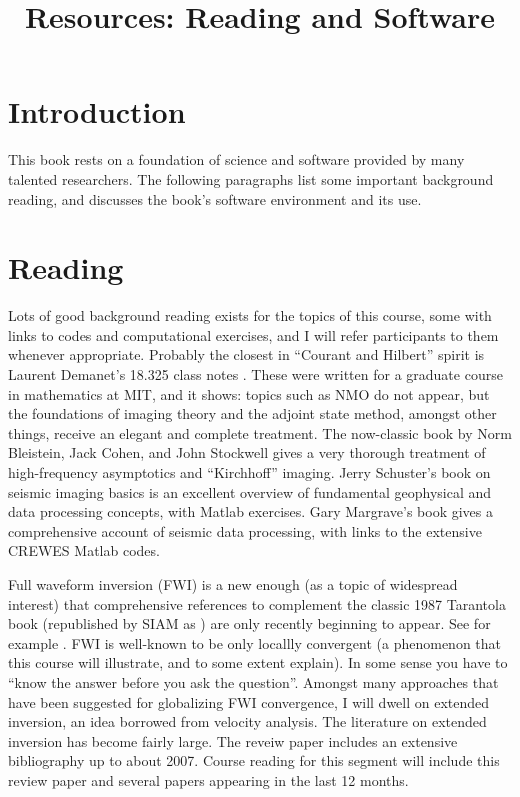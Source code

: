 \title{Resources: Reading and Software}
\maketitle 
\label{ch:madfigs}

\section{Introduction}
This book rests on a foundation of science and software provided by many talented researchers. The following paragraphs list some important background reading, and discusses the book's software environment and its use.

\section{Reading}
Lots of good background reading exists for the topics of this course, some with links to codes and computational exercises, and I will refer participants to them whenever appropriate. Probably the closest in ``Courant and Hilbert'' spirit is Laurent Demanet's 18.325 class notes \cite[]{Demanet:325notes}. These were written for a graduate course in mathematics at MIT, and it shows: topics such as NMO do not appear, but the foundations of imaging theory and the adjoint state method, amongst other things, receive an elegant and complete treatment. The now-classic book by Norm Bleistein, Jack Cohen, and John Stockwell \cite[]{BleisteinCohenStockwell:01} gives a very thorough treatment of high-frequency asymptotics and ``Kirchhoff'' imaging.  Jerry Schuster's book on seismic imaging basics \cite[]{Schuster:10} is an excellent overview of fundamental geophysical and data processing concepts, with Matlab exercises. Gary Margrave's book \cite[]{Margrave:book} gives a comprehensive account of seismic data processing, with links to the extensive CREWES Matlab codes. 

Full waveform inversion (FWI) is a new enough (as a topic of widespread interest) that comprehensive references to complement the classic 1987 Tarantola book (republished by SIAM as \cite[]{Tarantola:05}) are only recently beginning to appear. See for example \cite{Fichtner:10}. FWI is well-known to be only locallly convergent (a phenomenon that this course will illustrate, and to some extent explain). In some sense you have to ``know the answer before you ask the question''.  Amongst many approaches that have been suggested for globalizing FWI convergence, I will dwell on extended inversion, an idea borrowed from velocity analysis. The literature on extended inversion has become fairly large. The reveiw paper \cite{geoprosp:2008} includes an extensive bibliography up to about 2007. Course reading for this segment will include this review paper and several papers appearing in the last 12 months. 


